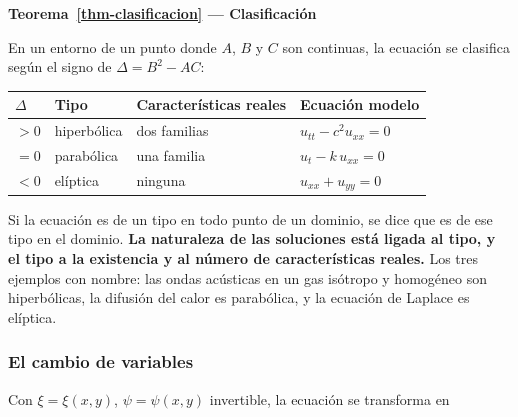 \documentclass[
  spanish,
  a4paper,
]{scrbook}
\newcounter{none} %
\theoremstyle{definition}
\theoremstyle{plain}
\theoremstyle{definition}
\theoremstyle{plain}
\theoremstyle{definition}
\theoremstyle{remark}
\begin{document}
\begin{tcolorbox}[enhanced jigsaw, arc=.35mm, bottomrule=.15mm, breakable, colback=white, colframe=quarto-callout-note-color-frame, left=2mm, leftrule=.75mm, opacityback=0, rightrule=.15mm, toprule=.15mm]
\begin{minipage}[t]{5.5mm}
\textcolor{quarto-callout-note-color}{\faInfo}
\end{minipage}%
\begin{minipage}[t]{\textwidth - 5.5mm}

\vspace{-3mm}\textbf{Teorema~\ref{thm-clasificacion} --- Clasificación}\vspace{3mm}

En un entorno de un punto donde \(A\), \(B\) y \(C\) son continuas, la
ecuación se clasifica según el signo de \(\Delta = B^2 - AC\):

{\def\LTcaptype{none} %
\begin{longtable}[]{@{}llll@{}}
\toprule\noalign{}
\(\Delta\) & Tipo & Características reales & Ecuación modelo \\
\midrule\noalign{}
\endhead
\bottomrule\noalign{}
\endlastfoot
\(>0\) & hiperbólica & dos familias & \(u_{tt} - c^2 u_{xx} = 0\) \\
\(=0\) & parabólica & una familia & \(u_t - k\,u_{xx} = 0\) \\
\(<0\) & elíptica & ninguna & \(u_{xx} + u_{yy} = 0\) \\
\end{longtable}
}

\end{minipage}%
\end{tcolorbox}

Si la ecuación es de un tipo en todo punto de un dominio, se dice que es
de ese tipo en el dominio. \textbf{La naturaleza de las soluciones está
ligada al tipo, y el tipo a la existencia y al número de características
reales.} Los tres ejemplos con nombre: las ondas acústicas en un gas
isótropo y homogéneo son hiperbólicas, la difusión del calor es
parabólica, y la ecuación de Laplace es elíptica.

\subsubsection{El cambio de variables}\label{el-cambio-de-variables}

Con \(\xi = \xi(x,y)\), \(\psi = \psi(x,y)\) invertible, la ecuación se
transforma en
\end{document}

